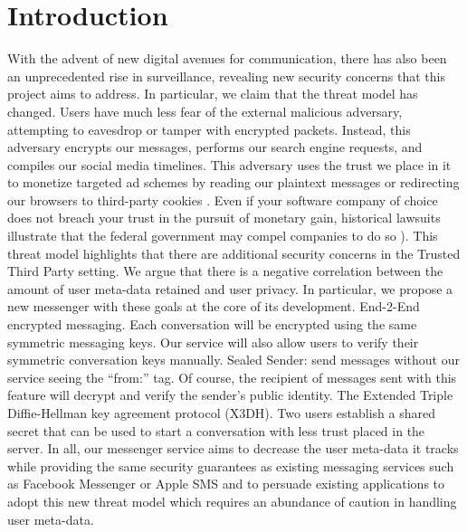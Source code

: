\documentclass[conference]{IEEEtran}
\begin{document}
\section{Introduction}
With the advent of new digital avenues for communication, there has also been an unprecedented rise in surveillance, revealing new security concerns that this project aims to address. In particular, we claim that the threat model has changed. Users have much less fear of the external malicious adversary, attempting to eavesdrop or tamper with encrypted packets. Instead, this adversary encrypts our messages, performs our search engine requests, and compiles our social media timelines. This adversary uses the trust we place in it to monetize targeted ad schemes by reading our plaintext messages \cite{https://www.bbc.com/news/technology-46618582} or redirecting our browsers to third-party cookies \cite{https://support.google.com/searchads/answer/2839090?hl=en}. Even if your software company of choice does not breach your trust in the pursuit of monetary gain, historical lawsuits illustrate that the federal government may compel companies to do so \cite{https://epic.org/documents/apple-v-fbi-2/}). This threat model highlights that there are additional security concerns in the Trusted Third Party setting. We argue that there is a negative correlation between the amount of user meta-data retained and user privacy. In particular, we propose a new messenger with these goals at the core of its development. End-2-End encrypted messaging. Each conversation will be encrypted using the same symmetric messaging keys. Our service will also allow users to verify their symmetric conversation keys manually. Sealed Sender: send messages without our service seeing the “from:” tag. Of course, the recipient of messages sent with this feature will decrypt and verify the sender’s public identity. The Extended Triple Diffie-Hellman key agreement protocol (X3DH). Two users establish a shared secret that can be used to start a conversation with less trust placed in the server. In all, our messenger service aims to decrease the user meta-data it tracks while providing the same security guarantees as existing messaging services such as Facebook Messenger or Apple SMS and to persuade existing applications to adopt this new threat model which requires an abundance of caution in handling user meta-data. 
\end{document}
